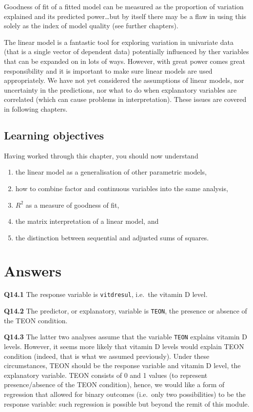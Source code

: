 \documentclass[
  oneside]{krantz}
\providecommand{\tightlist}{%
  \setlength{\itemsep}{0pt}\setlength{\parskip}{0pt}}
\begin{document}
Goodness of fit of a fitted model can be measured as the proportion of variation explained and its predicted power\ldots but by itself there may be a flaw in using this solely as the index of model quality (see further chapters).

The linear model is a fantastic tool for exploring variation in univariate data (that is a single vector of dependent data) potentially influenced by ther variables that can be expanded on in lots of ways. However, with great power comes great responsibility and it is important to make sure linear models are used appropriately. We have not yet considered the assumptions of linear models, nor uncertainty in the predictions, nor what to do when explanatory variables are correlated (which can cause problems in interpretation). These issues are covered in following chapters.

\hypertarget{learning-objectives-3}{%
\subsection{Learning objectives}\label{learning-objectives-3}}

Having worked through this chapter, you should now understand

\begin{enumerate}
\def\labelenumi{\arabic{enumi}.}
\tightlist
\item
  the linear model as a generalisation of other parametric models,
\item
  how to combine factor and continuous variables into the same analysis,
\item
  \(R^2\) as a measure of goodness of fit,
\item
  the matrix interpretation of a linear model, and
\item
  the distinction between sequential and adjusted sums of squares.
\end{enumerate}

\hypertarget{ANSlm}{%
\section{Answers}\label{ANSlm}}

\textbf{Q14.1} The response variable is \texttt{vitdresul}, i.e.~the vitamin D level.

\textbf{Q14.2} The predictor, or explanatory, variable is \texttt{TEON}, the presence or absence of the TEON condition.

\textbf{Q14.3} The latter two analyses assume that the variable \texttt{TEON} explains vitamin D levels. However, it seems more likely that vitamin D levels would explain TEON condition (indeed, that is what we assumed previously). Under these circumstances, TEON should be the response variable and vitamin D level, the explanatory variable. TEON consists of 0 and 1 values (to represent presence/absence of the TEON condition), hence, we would like a form of regression that allowed for binary outcomes (i.e.~only two possibilities) to be the response variable: such regression is possible but beyond the remit of this module.
\end{document}
